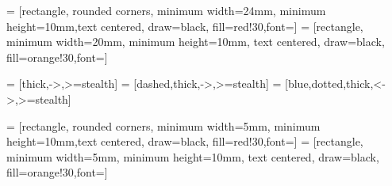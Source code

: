 \documentclass[a1paper,portrait,fontscale=0.45]{baposter}
\begin{document}

\usetikzlibrary{shapes,fit}
\tikzset{>=latex}
\usetikzlibrary{shapes.geometric, arrows.meta}

 = [rectangle, rounded corners, minimum width=24mm, minimum height=10mm,text centered, draw=black, fill=red!30,font=\small ]
 = [rectangle, minimum width=20mm, minimum height=10mm, text centered, draw=black, fill=orange!30,font=\small ]

 = [thick,->,>=stealth]
 = [dashed,thick,->,>=stealth]
 = [blue,dotted,thick,<->,>=stealth]

 = [rectangle, rounded corners, minimum width=5mm, minimum height=10mm,text centered, draw=black, fill=red!30,font=\small ]
 = [rectangle, minimum width=5mm, minimum height=10mm, text centered, draw=black, fill=orange!30,font=\small ]
\end{document}
